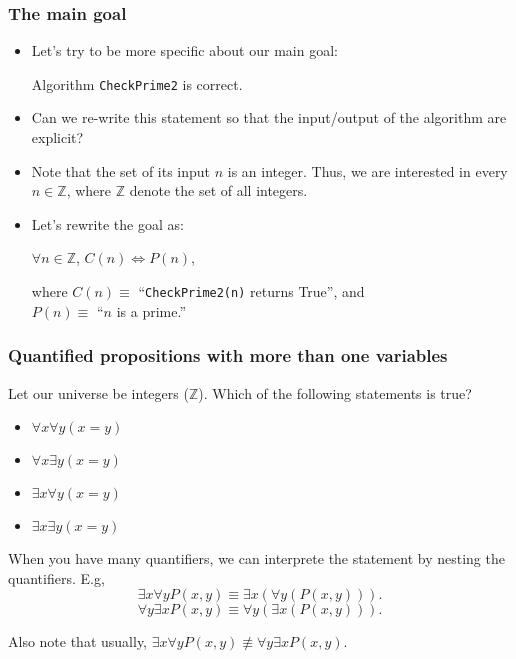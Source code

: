\begin{frame}\frametitle{The main goal}
  \begin{itemize}
  \item
    Let's try to be more specific about our main goal:
    
    \begin{tcolorbox}
      Algorithm {\tt CheckPrime2} is correct.
    \end{tcolorbox}

  \item
    Can we re-write this statement so that the input/output of the
    algorithm are explicit?

  \item
    Note that the set of its input $n$ is an integer.  Thus, we are
    interested in every $n\in\mathbb Z$, where $\mathbb Z$ denote the
    set of all integers.

  \item
    Let's rewrite the goal as:

    \begin{tcolorbox}
      \begin{center}
        $\forall n\in\mathbb Z$,
        $C(n)\Leftrightarrow P(n)$,
      \end{center}
    \end{tcolorbox}

    where $C(n)\equiv$ \pause ``{\tt CheckPrime2(n)} returns True'', and \\
    $P(n)\equiv$ \pause ``$n$ is a prime.''
  \end{itemize}
\end{frame}

\begin{frame}\frametitle{Quantified propositions with more than one variables}
  Let our universe be integers ($\mathbb Z$).  Which of the following statements is true?

  \begin{itemize}
  \item $\forall x\forall y (x=y)$
  \item $\forall x\exists y (x=y)$
  \item $\exists x\forall y (x=y)$
  \item $\exists x\exists y (x=y)$
  \end{itemize}

  \pause

  When you have many quantifiers, we can interprete the statement by
  nesting the quantifiers. E.g,
  \[\exists x\forall y P(x,y)\equiv \exists x (\forall y (P(x,y))).\]
  \[\forall y\exists x P(x,y)\equiv \forall y (\exists x (P(x,y))).\]
  \pause

  Also note that usually, $\exists x\forall y P(x,y)\not\equiv \forall
  y\exists x P(x,y)$.
\end{frame}

